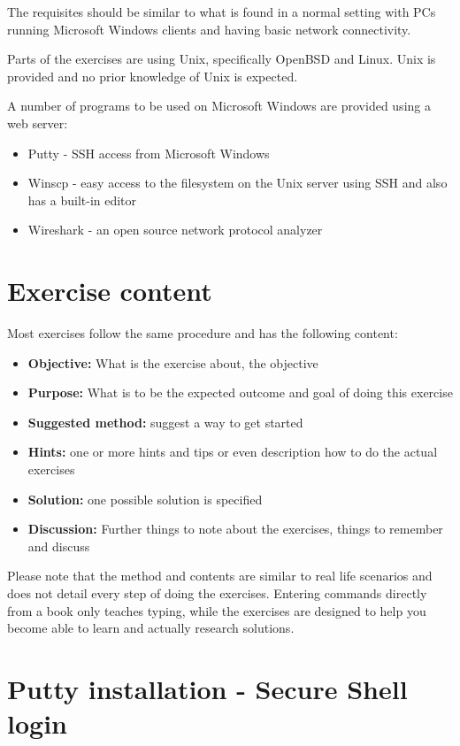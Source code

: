 \documentclass[a4paper,11pt,notitlepage]{report}
\begin{document}
The requisites should be similar to what is found in a normal setting with
PCs running Microsoft Windows clients and having basic network connectivity.

Parts of the exercises are using Unix, specifically OpenBSD and Linux. Unix
is provided and no prior knowledge of Unix is expected.

A number of programs to be used on Microsoft Windows are provided using
a web server:
\begin{itemize}
\item Putty - SSH access from Microsoft Windows
\item Winscp - easy access to the filesystem on the Unix server using SSH
and also has a built-in editor
\item Wireshark - an open source network protocol analyzer
\end{itemize}


\chapter*{\color{titlecolor}Exercise content}

Most exercises follow the same procedure and has the following content:
\begin{itemize}
\item {\bf Objective:} What is the exercise about, the objective
\item {\bf Purpose:} What is to be the expected outcome and goal of doing this exercise
\item {\bf Suggested method:} suggest a way to get started
\item {\bf Hints:} one or more hints and tips or even description how to
do the actual exercises
\item {\bf Solution:} one possible solution is specified
\item {\bf Discussion:} Further things to note about the exercises, things to remember and discuss
\end{itemize}

Please note that the method and contents are similar to real life scenarios and does not detail every step of doing the exercises. Entering commands directly from a book only teaches typing, while the exercises are designed to help you become able to learn and actually research solutions.



\chapter{Putty installation - Secure Shell login}
\label{ex:putty-install}
\end{document}
